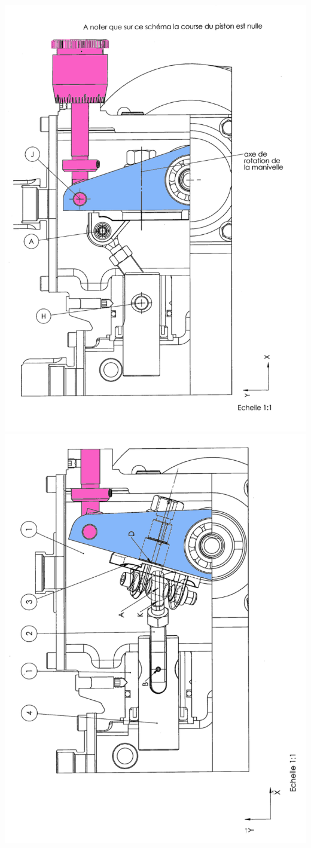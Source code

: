\begin{center}
 \includegraphics[width=0.9\linewidth]{img/Milroyal_4}\\
 \includegraphics[width=0.9\linewidth]{img/Milroyal_5}
\end{center}

